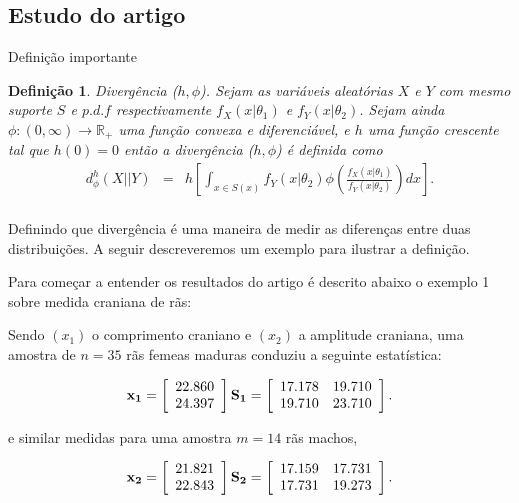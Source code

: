 \documentclass[10pt,a4paper]{article}
\newtheorem{definition}{Definição}[section]
\begin{document}
\subsection{Estudo do artigo  \cite{salicru_pardo_1994}}

Definição importante  

\begin{definition}{Divergência ($h,\phi$).}
	Sejam as variáveis aleatórias $X$ e $Y$ com mesmo suporte $S$  e $p.d.f$ respectivamente $f_{X}(x|\theta_1)$ e $f_{Y}(x|\theta_2)$. Sejam ainda $\phi:(0,\infty)\rightarrow \mathbb{R}_+$ uma função convexa e diferenciável, e $h$ uma função crescente tal que $h(0)=0$ então a divergência ($h,\phi$) é definida como
\begin{equation}\label{sec3eqn1}
\begin{array}{ccc}
	d_{\phi}^{h}(X||Y)&=&\displaystyle{h\left[\int_{x\in S(x)} f_{Y}(x|\theta_2)\phi\left(\frac{f_{X}(x|\theta_1)}{f_{Y}(x|\theta_2)}\right)dx \right]}. \\
\end{array}
\end{equation}
\end{definition}

Definindo que divergência é uma maneira de medir as diferenças entre duas distribuições. A seguir descreveremos um exemplo para ilustrar a definição.

Para começar a entender os resultados do artigo \cite{salicru_pardo_1994} é descrito abaixo o exemplo 1 sobre medida craniana de rãs:

Sendo $(x_1)$ o comprimento craniano e $(x_2)$ a amplitude craniana, uma amostra de $n=35$ rãs femeas maduras conduziu a seguinte estatística:

$$
{\bf x_1} = \left[
\begin{array}{c}
	22.860   \\
	24.397   \\
\end{array}
\right]
{\bf S_1} = \left[
\begin{array}{cc}
	 17.178  & 19.710   \\
         19.710  & 23.710   \\
\end{array}
\right].
$$

e similar medidas para uma amostra $m=14$ rãs machos, 

$$
{\bf x_2} = \left[
\begin{array}{c}
	21.821  \\
	22.843   \\
\end{array}
\right]
{\bf S_2} = \left[
\begin{array}{cc}
	 17.159  & 17.731   \\
         17.731  & 19.273   \\
\end{array}
\right].
$$
\end{document}
